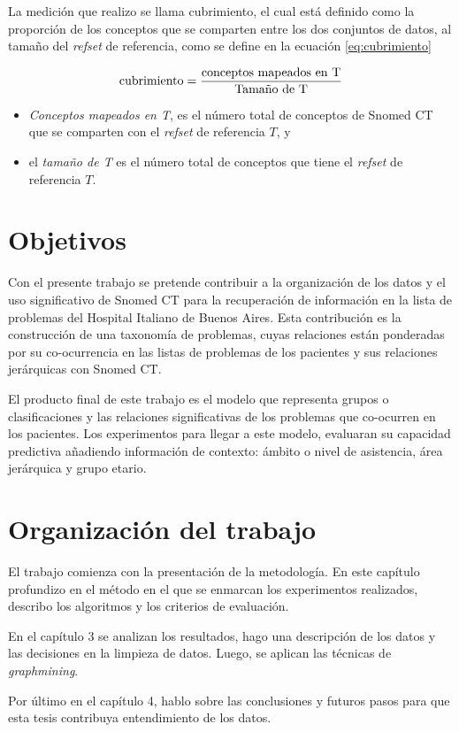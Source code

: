 La medición que realizo se llama cubrimiento, el cual está definido como la proporción de los conceptos que se comparten entre los dos conjuntos de datos, al tamaño del \textit{\acrshort{refset}} de referencia, como se define en la ecuación \ref{eq:cubrimiento}

\begin{equation}\label{eq:cubrimiento}
\textup{cubrimiento} = \frac{\textup{conceptos mapeados en T}}{\textup{Tamaño de T}}
\end{equation}

\begin{itemize}
\item \textit{Conceptos mapeados en T}, es el número total de conceptos de Snomed CT que se comparten con el \textit{refset} de referencia $T$, y
\item el \textit{tamaño de T} es el número total de conceptos que tiene el \textit{refset} de referencia $T$.
\end{itemize}

\section{Objetivos}
Con el presente trabajo se pretende contribuir a la organización de los datos y el uso significativo de Snomed CT para la recuperación de información en la lista de problemas del Hospital Italiano de Buenos Aires. Esta contribución es la construcción de una taxonomía de problemas, cuyas relaciones están ponderadas por su co-ocurrencia en las listas de problemas de los pacientes y sus relaciones jerárquicas con Snomed CT.

El producto final de este trabajo es el modelo que representa grupos o clasificaciones y las relaciones significativas de los problemas que co-ocurren en los pacientes. Los experimentos para llegar a este modelo, evaluaran su capacidad predictiva añadiendo información de contexto: ámbito o nivel de asistencia, área jerárquica y grupo etario. 

\section{Organización del trabajo}
% 
% 
El trabajo comienza con la presentación de la metodología. En este capítulo profundizo en el método en el que se enmarcan los experimentos realizados, describo los algoritmos y los criterios de evaluación.

En el capítulo 3 se analizan los resultados, hago una descripción de los datos y las decisiones en la limpieza de datos. Luego, se aplican las técnicas de \textit{graphmining}.
 
Por último en el capítulo 4, hablo sobre las conclusiones y futuros pasos para que esta tesis contribuya entendimiento de los datos.
